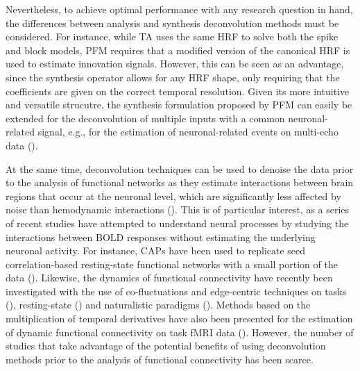 Nevertheless, to achieve optimal performance with any research question in hand, the differences between analysis and synthesis deconvolution methods must be considered. For instance, while TA uses the same HRF to solve both the spike and block models, PFM requires that a modified version of the canonical HRF is used to estimate innovation signals. However, this can be seen as an advantage, since the synthesis operator allows for any HRF shape, only requiring that the coefficients are given on the correct temporal resolution. Given its more intuitive and versatile strucutre, the synthesis formulation proposed by PFM can easily be extended for the deconvolution of multiple inputs with a common neuronal-related signal, e.g., for the estimation of neuronal-related events on multi-echo data (\citealt{CaballeroGaudes2019deconvolutionalgorithmmulti}).

At the same time, deconvolution techniques can be used to denoise the data prior to the analysis of functional networks as they estimate interactions between brain regions that occur at the neuronal level, which are significantly less affected by noise than hemodynamic interactions (\citealt{Gitelman2003Modelingregionalpsychophysiologic}). This is of particular interest, as a series of recent studies have attempted to understand neural processes by studying the interactions between BOLD responses without estimating the underlying neuronal activity. For instance, CAPs have been used to replicate seed correlation-based resting-state functional networks with a small portion of the data (\citealt{Liu2013Timevaryingfunctional,Liu2013Decompositionspontaneousbrain,Liu2018Coactivationpatterns,Majeed2009Spatiotemporaldynamicslow,Majeed2011Spatiotemporaldynamicslow,cifre2020revisiting,Cifre2020Furtherresultswhy,Zhang2020relationshipBOLDneural}). Likewise, the dynamics of functional connectivity have recently been investigated with the use of co-fluctuations and edge-centric techniques on tasks (\citealt{Faskowitz2021edgecentricmodel}), resting-state (\citealt{Esfahlani2020Highamplitudecofluctuations}) and naturalistic paradigms (\citealt{Faskowitz2020Edgecentricfunctional,Betzel2020Temporalfluctuationsbrains}). Methods based on the multiplication of temporal derivatives have also been presented for the estimation of dynamic functional connectivity on task fMRI data (\citealt{Shine2015Estimationdynamicfunctional,Shine2016DynamicsFunctionalBrain}). However, the number of studies that take advantage of the potential benefits of using deconvolution methods prior to the analysis of functional connectivity has been scarce.


